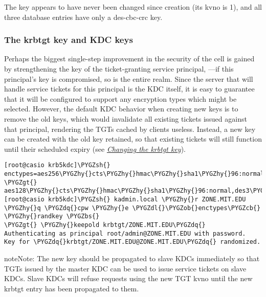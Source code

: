 \documentclass[letterpaper,10pt,english]{sphinxmanual}
\def\PYGZbs{\char`\\}
\def\PYGZob{\char`\{}
\def\PYGZcb{\char`\}}
\def\PYGZgt{\char`\>}
\def\PYGZsh{\char`\#}
\def\PYGZdl{\char`\$}
\def\PYGZhy{\char`\-}
\def\PYGZdq{\char`\"}
\begin{document}
The  key appears to have never been changed since creation
(its kvno is 1), and all three database entries have only a des-cbc-crc key.


\subsubsection{The krbtgt key and KDC keys}
\label{admin/advanced/retiring-des:the-krbtgt-key-and-kdc-keys}
Perhaps the biggest single-step improvement in the security of the cell
is gained by strengthening the key of the ticket-granting service principal,
---if this principal's key is compromised, so is the
entire realm.  Since the server that will handle service tickets
for this principal is the KDC itself, it is easy to guarantee that it
will be configured to support any encryption types which might be
selected.  However, the default KDC behavior when creating new keys is to
remove the old keys, which would invalidate all existing tickets issued
against that principal, rendering the TGTs cached by clients useless.
Instead, a new key can be created with the old key retained, so that
existing tickets will still function until their scheduled expiry
(see {\hyperref[admin/database:changing-krbtgt-key]{\emph{Changing the krbtgt key}}}).

\begin{Verbatim}[commandchars=\\\{\}]
[root@casio krb5kdc]\PYGZsh{} enctypes=aes256\PYGZhy{}cts\PYGZhy{}hmac\PYGZhy{}sha1\PYGZhy{}96:normal,\PYGZbs{}
\PYGZgt{} aes128\PYGZhy{}cts\PYGZhy{}hmac\PYGZhy{}sha1\PYGZhy{}96:normal,des3\PYGZhy{}hmac\PYGZhy{}sha1:normal,des\PYGZhy{}cbc\PYGZhy{}crc:normal
[root@casio krb5kdc]\PYGZsh{} kadmin.local \PYGZhy{}r ZONE.MIT.EDU \PYGZhy{}q \PYGZdq{}cpw \PYGZhy{}e \PYGZdl{}\PYGZob{}enctypes\PYGZcb{} \PYGZhy{}randkey \PYGZbs{}
\PYGZgt{} \PYGZhy{}keepold krbtgt/ZONE.MIT.EDU\PYGZdq{}
Authenticating as principal root/admin@ZONE.MIT.EDU with password.
Key for \PYGZdq{}krbtgt/ZONE.MIT.EDU@ZONE.MIT.EDU\PYGZdq{} randomized.
\end{Verbatim}

\begin{notice}{note}{Note:}
The new  key should be propagated to slave KDCs
immediately so that TGTs issued by the master KDC can be used to
issue service tickets on slave KDCs.  Slave KDCs will refuse requests
using the new TGT kvno until the new krbtgt entry has been propagated
to them.
\end{notice}
\end{document}
